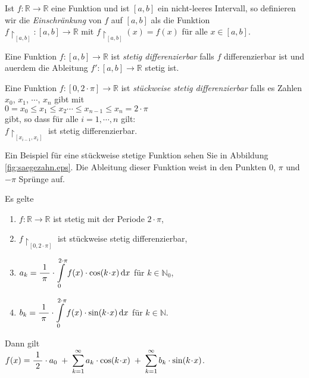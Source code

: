 \begin{Definition}
  Ist $f:\mathbb{R} \rightarrow \mathbb{R}$ eine Funktion und ist $[a,b]$ ein nicht-leeres
  Intervall, so definieren wir die \emph{Einschr\"ankung} von $f$ auf $[a,b]$ als die
  Funktion 
  \\[0.1cm]
  \hspace*{1.3cm}
  $f\!\upharpoonright_{[a,b]} : [a,b] \rightarrow \mathbb{R}$ \quad mit $f\!\upharpoonright_{[a,b]}(x) = f(x)$ f\"ur alle $x \in [a,b]$.
\end{Definition}

\begin{Definition}
  Eine Funktion $f:[a,b] \rightarrow \mathbb{R}$ ist \emph{stetig differenzierbar}
  falls $f$ differenzierbar ist und au\3erdem die Ableitung $f':[a,b] \rightarrow
  \mathbb{R}$ stetig ist. 
\end{Definition}

\begin{Definition}
  Eine Funktion $f:[0,2\!\cdot\!\pi] \rightarrow \mathbb{R}$ ist \emph{st\"uckweise stetig differenzierbar} 
  falls es  Zahlen $x_0$, $x_1$, $\cdots$, $x_n$ gibt mit 
  \\[0.1cm]
  \hspace*{1.3cm}
  $0 = x_0\leq x_1 \leq x_2 \cdots \leq x_{n-1} \leq x_n = 2\!\cdot\!\pi$
  \\[0.1cm]
  gibt, so dass f\"ur alle $i=1,\cdots,n$ gilt: 
  \\[0.1cm]
  \hspace*{1.3cm}
  $f\!\upharpoonright_{[x_{i-1}, x_i]}$ ist stetig differenzierbar.  
\end{Definition}

Ein Beispiel f\"ur eine st\"uckweise stetige Funktion sehen Sie in Abbildung
\ref{fig:saegezahn.eps}.  Die Ableitung dieser Funktion weist in den Punkten $0$, $\pi$
und $-\pi$ Spr\"unge auf.

\begin{Satz} Es gelte
  \begin{enumerate}
  \item $f:\mathbb{R} \rightarrow \mathbb{R}$ ist  stetig mit der Periode $2\cdot\pi$,
  \item $f\!\upharpoonright_{[0,2\!\cdot\!\pi]}$ ist  st\"uckweise stetig differenzierbar,
  \item $a_k = \displaystyle\frac{\;\displaystyle1\;}{\;\displaystyle\pi\;} \cdot\int\limits_0^{2\cdot\pi}f(x)\cdot\cos(k\!\cdot\!x)\,\textrm{d} x$ \quad f\"ur $k \in \mathbb{N}_0$,
  \item $b_k = \displaystyle\frac{\;\displaystyle1\;}{\;\displaystyle\pi\;}\cdot\int\limits_0^{2\cdot\pi}f(x)\cdot\sin(k\!\cdot\!x)\,\textrm{d} x$ \quad f\"ur $k \in \mathbb{N}$.  
  \end{enumerate}
  Dann gilt \\[0.1cm]
  \hspace*{1.3cm}
  $f(x) = \displaystyle\frac{\;\displaystyle1\;}{\;\displaystyle2\;}\cdot a_0 \;+\; \sum\limits_{k=1}^\infty a_k\cdot \cos(k\!\cdot\!x) \;+\;
                                      \sum\limits_{k=1}^\infty b_k\cdot \sin(k\!\cdot\!x)$.
\end{Satz}

